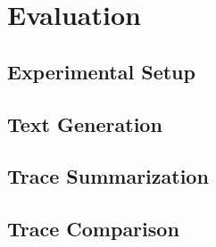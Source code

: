 \section{Evaluation}
\label{sec:evaluation}

\subsection{Experimental Setup}

\subsection{Text Generation}

\subsection{Trace Summarization}

\subsection{Trace Comparison}